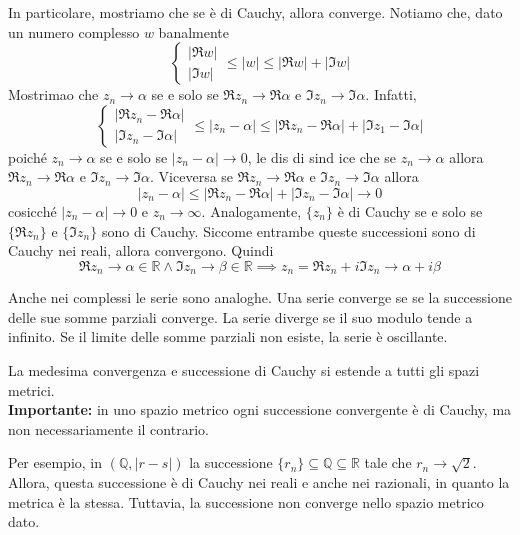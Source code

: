 \documentclass[a4paper]{article}
\begin{document}
In particolare, mostriamo che se è di Cauchy, allora converge.
Notiamo che, dato un numero complesso \(w\) banalmente
\[
    \begin{cases}
        |\Re w| \\ |\Im w|
    \end{cases}
    \leq |w| \leq |\Re w| + |\Im w|
\]
Mostrimao che \(z_n \to \alpha\) se e solo se \(\Re z_n \to \Re \alpha\)
e \(\Im z_n \to \Im \alpha\).
Infatti,
\[
    \begin{cases}
        |\Re z_n - \Re \alpha| \\ |\Im z_n - \Im \alpha|
    \end{cases}
    \leq |z_n - \alpha| \leq |\Re z_n - \Re \alpha| + |\Im z_1 - \Im \alpha|
\]
poiché \(z_n \to \alpha\) se e solo se \(|z_n - \alpha| \to 0\),
le dis di sind ice che se \(z_n \to \alpha\)
allora \(\Re z_n \to \Re \alpha\) e
\(\Im z_n \to \Im \alpha\).
Viceversa se \(\Re z_n \to \Re \alpha\) e \(\Im z_n \to \Im \alpha\)
allora
\[
    |z_n - \alpha| \leq |\Re z_n - \Re \alpha| + |\Im z_n - \Im \alpha| \to 0
\]
cosicché \(|z_n - \alpha| \to 0\) e \(z_n \to \infty\).
Analogamente, \(\{z_n\}\) è di Cauchy se e solo se \(\{\Re z_n\}\)
e \(\{\Im z_n\}\) sono di Cauchy.
Siccome entrambe queste successioni sono di Cauchy nei reali, allora convergono.
Quindi \[
    \Re z_n \to \alpha \in \mathbb{R} \land 
    \Im z_n \to \beta \in \mathbb{R}
    \implies z_n = \Re z_n + i\Im z_n \to \alpha + i\beta
\]

Anche nei complessi le serie sono analoghe. Una serie converge se
se la successione delle sue somme parziali converge.
La serie diverge se il suo modulo tende a infinito. Se il limite delle somme parziali non esiste,
la serie è oscillante.

La medesima convergenza e successione di Cauchy si estende a tutti gli spazi metrici. \\
\textbf{Importante:} in uno spazio metrico ogni successione convergente è di Cauchy, ma non necessariamente il contrario.

Per esempio, in \((\mathbb{Q}, |r-s|)\) la successione \(\{r_n\} \subseteq \mathbb{Q} \subseteq \mathbb{R}\)
tale che \(r_n \to \sqrt{2}\). Allora, questa successione è di Cauchy nei reali e anche nei razionali,
in quanto la metrica è la stessa. Tuttavia, la successione non converge nello spazio metrico dato.

\end{document}
